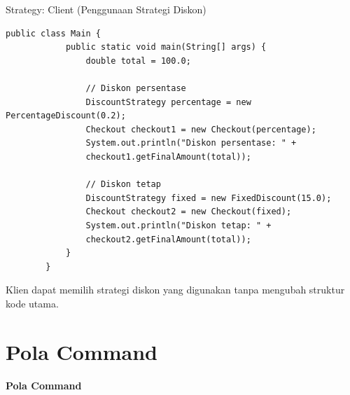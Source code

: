 \documentclass[aspectratio=169, table]{beamer}
\begin{document}
\begin{frame}[fragile]{Strategy: Client (Penggunaan Strategi Diskon)}
	\vspace{10pt}
	\begin{lstlisting}[style=JavaStyle]
		public class Main {
			public static void main(String[] args) {
				double total = 100.0;
				
				// Diskon persentase
				DiscountStrategy percentage = new PercentageDiscount(0.2);
				Checkout checkout1 = new Checkout(percentage);
				System.out.println("Diskon persentase: " +
				checkout1.getFinalAmount(total));
				
				// Diskon tetap
				DiscountStrategy fixed = new FixedDiscount(15.0);
				Checkout checkout2 = new Checkout(fixed);
				System.out.println("Diskon tetap: " +
				checkout2.getFinalAmount(total));
			}
		}
	\end{lstlisting}
	\vspace{4pt}
	\small Klien dapat memilih strategi diskon yang digunakan tanpa mengubah struktur kode utama.
\end{frame}

\section{Pola Command}

\begin{frame}{\hfill}
	\centering
	\textbf{\Huge{Pola Command}}
\end{frame}
\end{document}
